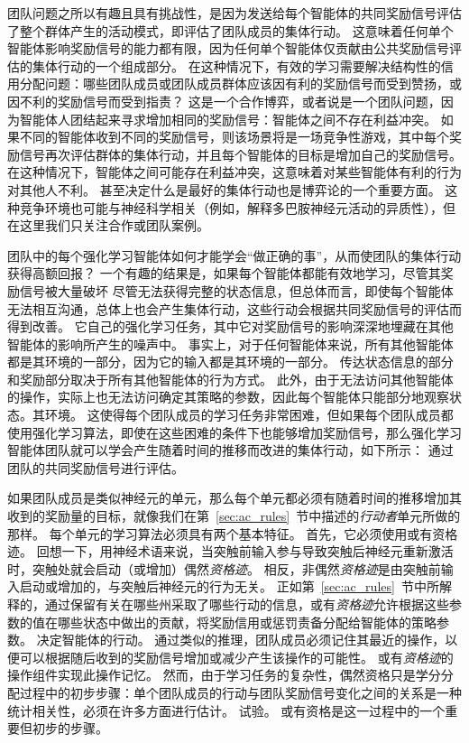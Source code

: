 团队问题之所以有趣且具有挑战性，是因为发送给每个智能体的共同奖励信号评估了整个群体产生的活动模式，即评估了团队成员的集体行动。
这意味着任何单个智能体影响奖励信号的能力都有限，因为任何单个智能体仅贡献由公共奖励信号评估的集体行动的一个组成部分。
在这种情况下，有效的学习需要解决结构性的信用分配问题：哪些团队成员或团队成员群体应该因有利的奖励信号而受到赞扬，或因不利的奖励信号而受到指责？
这是一个合作博弈，或者说是一个团队问题，因为智能体人团结起来寻求增加相同的奖励信号：智能体之间不存在利益冲突。
如果不同的智能体收到不同的奖励信号，则该场景将是一场竞争性游戏，其中每个奖励信号再次评估群体的集体行动，并且每个智能体的目标是增加自己的奖励信号。
在这种情况下，智能体之间可能存在利益冲突，这意味着对某些智能体有利的行为对其他人不利。
甚至决定什么是最好的集体行动也是博弈论的一个重要方面。
这种竞争环境也可能与神经科学相关（例如，解释多巴胺神经元活动的异质性），但在这里我们只关注合作或团队案例。


团队中的每个强化学习智能体如何才能学会“做正确的事”，从而使团队的集体行动获得高额回报？
一个有趣的结果是，如果每个智能体都能有效地学习，尽管其奖励信号被大量破坏 尽管无法获得完整的状态信息，但总体而言，即使每个智能体无法相互沟通，总体上也会产生集体行动，这些行动会根据共同奖励信号的评估而得到改善。
它自己的强化学习任务，其中它对奖励信号的影响深深地埋藏在其他智能体的影响所产生的噪声中。
事实上，对于任何智能体来说，所有其他智能体都是其环境的一部分，因为它的输入都是其环境的一部分。
传达状态信息的部分和奖励部分取决于所有其他智能体的行为方式。
此外，由于无法访问其他智能体的操作，实际上也无法访问确定其策略的参数，因此每个智能体只能部分地观察状态。其环境。
这使得每个团队成员的学习任务非常困难，但如果每个团队成员都使用强化学习算法，即使在这些困难的条件下也能够增加奖励信号，那么强化学习智能体团队就可以学会产生随着时间的推移而改进的集体行动，如下所示： 通过团队的共同奖励信号进行评估。


如果团队成员是类似神经元的单元，那么每个单元都必须有随着时间的推移增加其收到的奖励量的目标，就像我们在第~\ref{sec:ac_rules}~节中描述的\textit{行动者}单元所做的那样。
每个单元的学习算法必须具有两个基本特征。
首先，它必须使用或有资格迹。
回想一下，用神经术语来说，当突触前输入参与导致突触后神经元重新激活时，突触处就会启动（或增加）偶然\textit{资格迹}。
相反，非偶然\textit{资格迹}是由突触前输入启动或增加的，与突触后神经元的行为无关。
正如第~\ref{sec:ac_rules}~节中所解释的，通过保留有关在哪些州采取了哪些行动的信息，或有\textit{资格迹}允许根据这些参数的值在哪些状态中做出的贡献，将奖励信用或惩罚责备分配给智能体的策略参数。
决定智能体的行动。
通过类似的推理，团队成员必须记住其最近的操作，以便可以根据随后收到的奖励信号增加或减少产生该操作的可能性。
或有\textit{资格迹}的操作组件实现此操作记忆。
然而，由于学习任务的复杂性，偶然资格只是学分分配过程中的初步步骤：单个团队成员的行动与团队奖励信号变化之间的关系是一种统计相关性，必须在许多方面进行估计。
试验。
或有资格是这一过程中的一个重要但初步的步骤。


